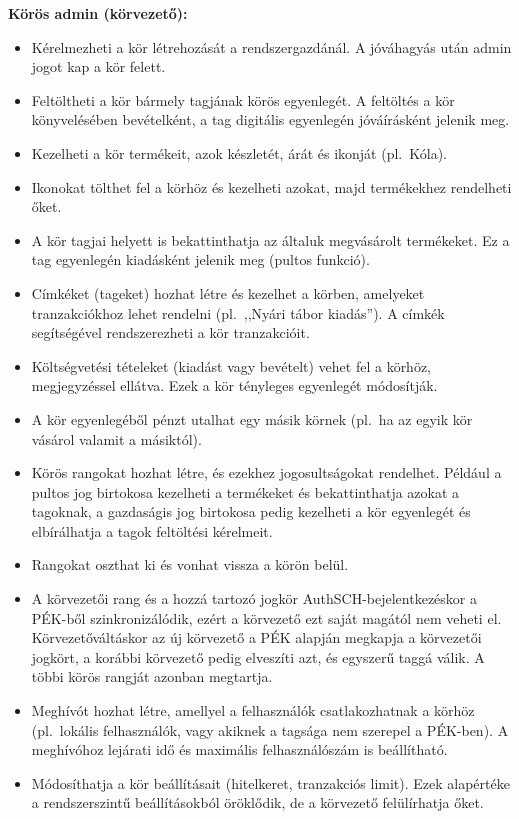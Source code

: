 \noindent\textbf{Körös admin (körvezető):}
\begin{itemize}
	\item Kérelmezheti a kör létrehozását a rendszergazdánál. A jóváhagyás után admin jogot kap a kör felett.
	\item Feltöltheti a kör bármely tagjának körös egyenlegét. A feltöltés a kör könyvelésében bevételként, a tag digitális egyenlegén jóváírásként jelenik meg.
	\item Kezelheti a kör termékeit, azok készletét, árát és ikonját (pl.\ Kóla).
	\item Ikonokat tölthet fel a körhöz és kezelheti azokat, majd termékekhez rendelheti őket.
	\item A kör tagjai helyett is bekattinthatja az általuk megvásárolt termékeket. Ez a tag egyenlegén kiadásként jelenik meg (pultos funkció).
	\item Címkéket (tageket) hozhat létre és kezelhet a körben, amelyeket tranzakciókhoz lehet rendelni (pl.\ ,,Nyári tábor kiadás''). A címkék segítségével rendszerezheti a kör tranzakcióit.
	\item Költségvetési tételeket (kiadást vagy bevételt) vehet fel a körhöz, megjegyzéssel ellátva. Ezek a kör tényleges egyenlegét módosítják.
	\item A kör egyenlegéből pénzt utalhat egy másik körnek (pl.\ ha az egyik kör vásárol valamit a másiktól).
	\item Körös rangokat hozhat létre, és ezekhez jogosultságokat rendelhet. Például a pultos jog birtokosa kezelheti a termékeket és bekattinthatja azokat a tagoknak, a gazdaságis jog birtokosa pedig kezelheti a kör egyenlegét és elbírálhatja a tagok feltöltési kérelmeit.
	\item Rangokat oszthat ki és vonhat vissza a körön belül.
	\item A körvezetői rang és a hozzá tartozó jogkör AuthSCH-bejelentkezéskor a PÉK-ből szinkronizálódik, ezért a körvezető ezt saját magától nem veheti el. Körvezetőváltáskor az új körvezető a PÉK alapján megkapja a körvezetői jogkört, a korábbi körvezető pedig elveszíti azt, és egyszerű taggá válik. A többi körös rangját azonban megtartja.
	\item Meghívót hozhat létre, amellyel a felhasználók csatlakozhatnak a körhöz (pl.\ lokális felhasználók, vagy akiknek a tagsága nem szerepel a PÉK-ben). A meghívóhoz lejárati idő és maximális felhasználószám is beállítható.
	\item Módosíthatja a kör beállításait (hitelkeret, tranzakciós limit). Ezek alapértéke a rendszerszintű beállításokból öröklődik, de a körvezető felülírhatja őket.
\end{itemize}

